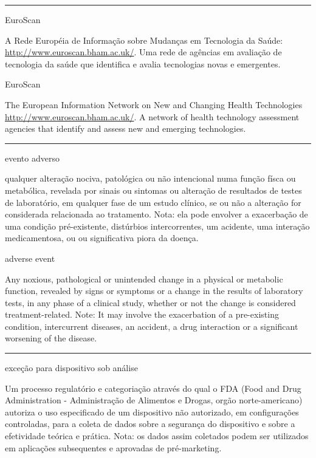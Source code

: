 \documentclass[
]{book}
\begin{document}
\begin{center}\rule{0.5\linewidth}{0.5pt}\end{center}

EuroScan

A Rede Européia de Informação sobre Mudanças em Tecnologia da Saúde: \url{http://www.euroscan.bham.ac.uk/}. Uma rede de agências em avaliação de tecnologia da saúde que identifica e avalia tecnologias novas e emergentes.

EuroScan

The European Information Network on New and Changing Health Technologies \url{http://www.euroscan.bham.ac.uk/}. A network of health technology assessment agencies that identify and assess new and emerging technologies.

\begin{center}\rule{0.5\linewidth}{0.5pt}\end{center}

evento adverso

qualquer alteração nociva, patológica ou não intencional numa função físca ou metabólica, revelada por sinais ou sintomas ou alteração de resultados de testes de laboratório, em qualquer fase de um estudo clínico, se ou não a alteração for considerada relacionada ao tratamento. Nota: ela pode envolver a exacerbação de uma condição pré-existente, distúrbios intercorrentes, um acidente, uma interação medicamentosa, ou ou significativa piora da doença.

adverse event

Any noxious, pathological or unintended change in a physical or metabolic function, revealed by signs or symptoms or a change in the results of laboratory tests, in any phase of a clinical study, whether or not the change is considered treatment-related. Note: It may involve the exacerbation of a pre-existing condition, intercurrent diseases, an accident, a drug interaction or a significant worsening of the disease.

\begin{center}\rule{0.5\linewidth}{0.5pt}\end{center}

exceção para dispositivo sob análise

Um processo regulatório e categoriação através do qual o FDA (Food and Drug Administration - Administração de Alimentos e Drogas, orgão norte-americano) autoriza o uso especificado de um dispositivo não autorizado, em configurações controladas, para a coleta de dados sobre a segurança do dispositivo e sobre a efetividade teórica e prática. Nota: os dados assim coletados podem ser utilizados em aplicações subsequentes e aprovadas de pré-marketing.
\end{document}
